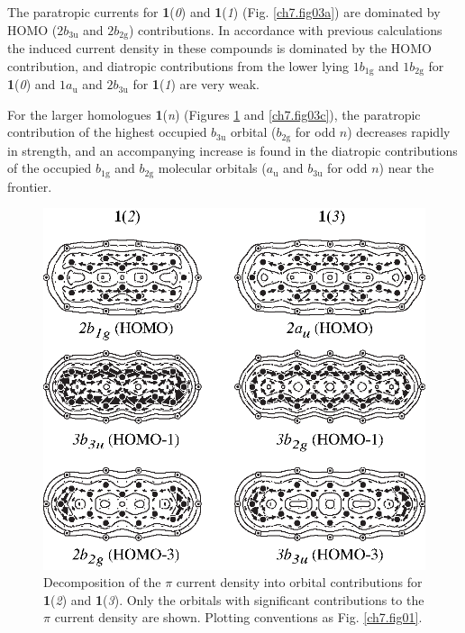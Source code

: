 The paratropic currents for \textbf{1}(\textit{0}) and \textbf{1}(\textit{1}) (Fig. \ref{ch7.fig03a}) are dominated by HOMO ($2b_\mathrm{3u}$ and $2b_\mathrm{2g}$) contributions. In accordance with previous calculations  \cite{r14,r35,r36} the induced current density in these compounds is dominated by the HOMO contribution, and diatropic contributions from the lower lying $1b_\mathrm{1g}$ and $1b_\mathrm{2g}$ for \textbf{1}(\textit{0}) and $1a_\mathrm{u}$ and $2b_\mathrm{3u}$ for \textbf{1}(\textit{1}) are very weak.

For the larger homologues \textbf{1}(\textit{n}) (Figures \ref{ch7.fig03b} and \ref{ch7.fig03c}), the paratropic contribution of the highest occupied $b_\mathrm{3u}$ orbital ($b_\mathrm{2g}$ for odd $n$) decreases rapidly in strength, and an accompanying increase is found in the diatropic contributions of the occupied $b_\mathrm{1g}$ and $b_\mathrm{2g}$ molecular orbitals ($a_\mathrm{u}$ and $b_\mathrm{3u}$ for odd $n$) near the frontier.
\begin{figure}[htp]
\center
\includegraphics{indacene/figures/figure3b.eps}
\caption{Decomposition of the $\pi$ current density into orbital contributions for \textbf{1}(\textit{2}) and \textbf{1}(\textit{3}). Only the orbitals with significant contributions to the $\pi$ current density are shown. Plotting conventions as Fig. \ref{ch7.fig01}.}
\label{ch7.fig03b}
\end{figure}
